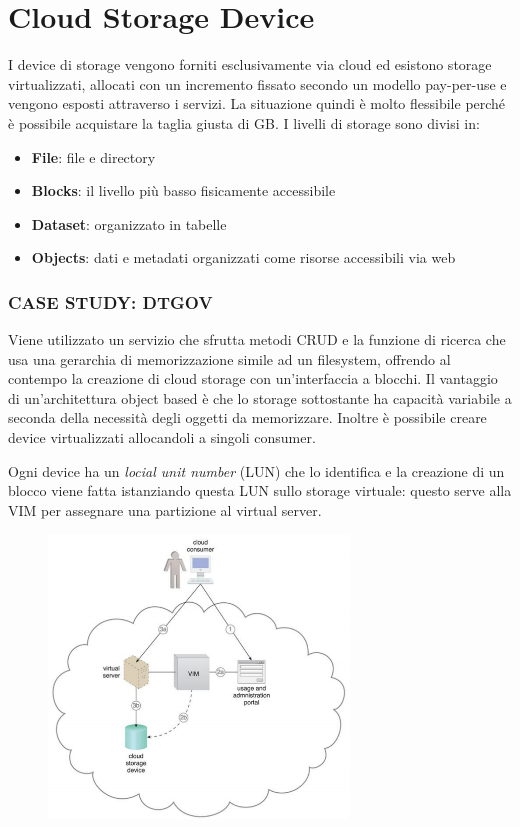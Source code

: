 \section{Cloud Storage Device}
I device di storage vengono forniti esclusivamente via cloud ed esistono storage virtualizzati, allocati con un incremento fissato secondo un modello pay-per-use e vengono esposti attraverso i servizi. La situazione quindi è molto flessibile perché è possibile acquistare la taglia giusta di GB. I livelli di storage sono divisi in:
\begin{itemize}
    \item \textbf{File}: file e directory
    \item \textbf{Blocks}: il livello più basso fisicamente accessibile
    \item \textbf{Dataset}: organizzato in tabelle
    \item \textbf{Objects}: dati e metadati organizzati come risorse accessibili via web
\end{itemize}

\subsubsection{\textbf{CASE STUDY: DTGOV}}
Viene utilizzato un servizio che sfrutta metodi CRUD e la funzione di ricerca che usa una gerarchia di memorizzazione simile ad un filesystem, offrendo al contempo la creazione di cloud storage con un'interfaccia a blocchi. Il vantaggio di un'architettura object based è che lo storage sottostante ha capacità variabile a seconda della necessità degli oggetti da memorizzare. Inoltre è possibile creare device virtualizzati allocandoli a singoli consumer.

Ogni device ha un \textit{locial unit number} (LUN) che lo identifica e la creazione di un blocco viene fatta istanziando questa LUN sullo storage virtuale: questo serve alla VIM per assegnare una partizione al virtual server.

\begin{figure}[htb!]
    \centering
    \includegraphics[width=8cm]{./Images/cap8/8.4.png}
\end{figure}

